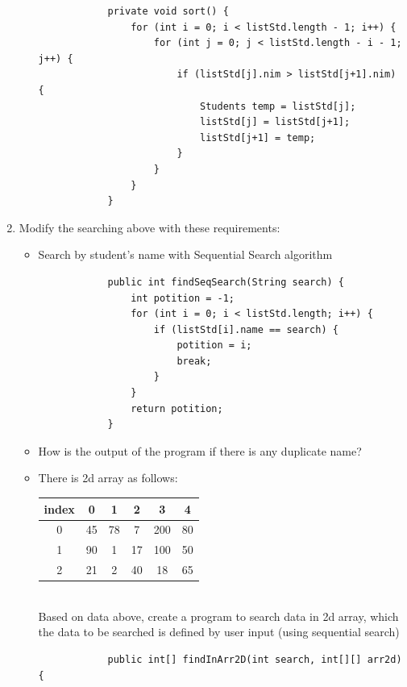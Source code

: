 \documentclass[12pt,titlepage]{article}
\begin{document}
\begin{enumerate}
\begin{enumerate}
\begin{verbatim}
            private void sort() {
                for (int i = 0; i < listStd.length - 1; i++) {
                    for (int j = 0; j < listStd.length - i - 1; j++) {
                        if (listStd[j].nim > listStd[j+1].nim) {
                            Students temp = listStd[j];
                            listStd[j] = listStd[j+1];
                            listStd[j+1] = temp;
                        }
                    }
                }
            } 
        \end{verbatim} 
    \end{enumerate}
    \item Modify the searching above with these requirements:
    \begin{itemize}
        \item Search by student’s name with Sequential Search algorithm
        \begin{verbatim}
            public int findSeqSearch(String search) {
                int potition = -1;
                for (int i = 0; i < listStd.length; i++) {
                    if (listStd[i].name == search) {
                        potition = i;
                        break;
                    }
                }
                return potition;
            }
        \end{verbatim}
        \item How is the output of the program if there is any duplicate name?
        \item There is 2d array as follows:
        \mbox{}\\
        \begin{tabular}{|c|c|c|c|c|c|}
            \hline
            index  & 0  & 1  & 2  & 3   & 4  \\
            \hline
            0      & 45 & 78 & 7  & 200 & 80 \\
            \hline
            1      & 90 & 1  & 17 & 100 & 50 \\
            \hline
            2      & 21 & 2  & 40 & 18  & 65 \\
            \hline
        \end{tabular}
        \mbox{}\\
        Based on data above, create a program to search data in 2d array, which the data to be searched is defined by user input (using sequential search)
        \begin{verbatim}
            public int[] findInArr2D(int search, int[][] arr2d) {

\end{verbatim}
\end{itemize}
\end{enumerate}
\end{document}
